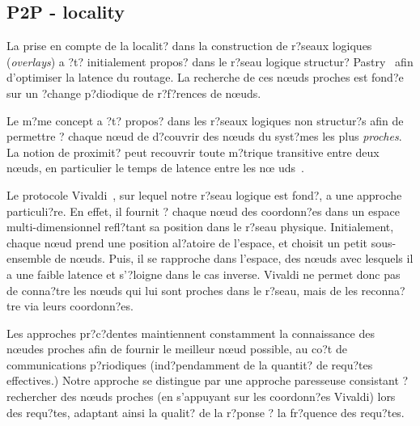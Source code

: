 
\subsection{P2P - locality}


La prise en compte de la localit? dans la construction de r?seaux logiques
(\emph{overlays}) a ?t? initialement propos? dans le r?seau logique structur?
Pastry~\cite{pastry} afin d'optimiser la latence du routage. La recherche de ces
n\oe uds proches est fond?e sur un ?change p?diodique de r?f?rences de n\oe uds.

Le m?me concept a ?t? propos? dans les r?seaux logiques non structur?s afin de
permettre ? chaque n\oe ud de d?couvrir des n\oe uds du syst?mes les plus
\emph{proches}. La notion de proximit? peut recouvrir toute m?trique transitive
entre deux n\oe uds, en particulier le temps de latence entre les n\oe
uds~\cite{refquivabienmarindoittrouver}.

Le protocole Vivaldi~\cite{dabek:2001:sigcomm04}, sur lequel notre r?seau logique est fond?,
a une approche particuli?re. En effet, il fournit ? chaque n\oe ud des
coordonn?es dans un espace multi-dimensionnel refl?tant sa position dans le
r?seau physique. Initialement, chaque n\oe ud prend une position al?atoire de
l'espace, et choisit un petit sous-ensemble de n\oe uds. Puis, il se rapproche
dans l'espace, des n\oe uds avec lesquels il a une faible latence et s'?loigne
dans le cas inverse. Vivaldi ne permet donc pas de conna?tre les n\oe uds qui
lui sont proches dans le r?seau, mais de les reconna?tre via leurs coordonn?es.

Les approches pr?c?dentes maintiennent constamment la connaissance des n\oe udes
proches afin de fournir le meilleur n\oe ud possible, au co?t de communications
p?riodiques (ind?pendamment de la quantit? de requ?tes effectives.) Notre
approche se distingue par une approche paresseuse consistant ? rechercher des
n\oe uds proches (en s'appuyant sur les coordonn?es Vivaldi) lors des requ?tes,
adaptant ainsi la qualit? de la r?ponse ? la fr?quence des requ?tes.


